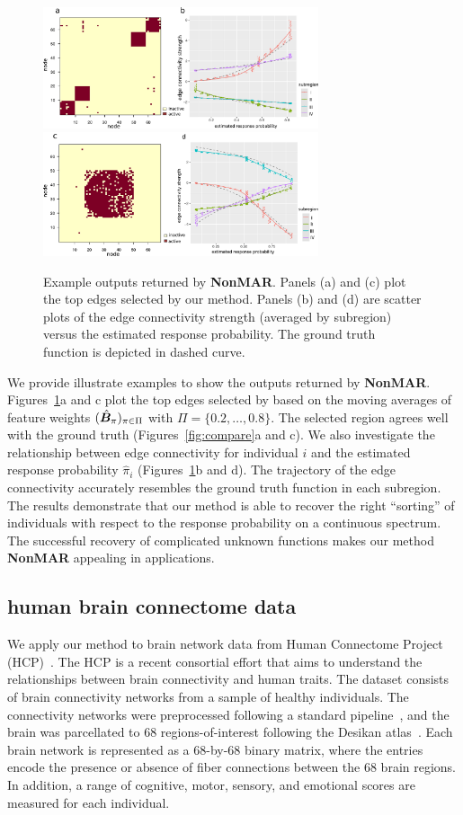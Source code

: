 \documentclass[11pt]{article}
\theoremstyle{plain}
\theoremstyle{definition}
\def\NonparaM{\text{\bf \small NonMAR }}
\begin{document}
\begin{figure}[ht]
    \centering
   \includegraphics[width=8.1cm]{est_block.pdf}
          \includegraphics[width=8.1cm]{est_circle.pdf}
 \caption{Example outputs returned by {\bf \small NonMAR}. Panels (a) and (c) plot the top edges selected by our method. Panels (b) and (d) are scatter plots of the edge connectivity strength (averaged by subregion) versus the estimated response probability. The ground truth function is depicted in dashed curve.}\label{fig:compare2}
\end{figure}


We provide illustrate examples to show the outputs returned by {\bf \small NonMAR}. Figures~\ref{fig:compare2}a and c plot the top edges selected by \NonparaM based on the moving averages of feature weights $(\hat {\bm B}_\pi)_{\pi\in\Pi}$ with $\Pi = \{0.2,\ldots,0.8\}$. The selected region agrees well with the ground truth (Figures~\ref{fig:compare}a and c). We also investigate the relationship between edge connectivity for individual $i$ and the estimated response probability $\hat \pi_i$ (Figures~\ref{fig:compare2}b and d). The trajectory of the edge connectivity accurately resembles the ground truth function in each subregion. The results demonstrate that our method is able to recover the right ``sorting'' of individuals with respect to the response probability on a continuous spectrum. 
The successful recovery of complicated unknown functions makes our method {\bf \small NonMAR} appealing in applications. 

\subsection{human brain connectome data}\label{sec:real}
We apply our method to brain network data from Human Connectome Project (HCP)~\citep{van2013wu}. The HCP is a recent consortial effort that aims to understand the relationships between brain connectivity and human traits. The dataset consists of brain connectivity networks from a sample of healthy individuals. The connectivity networks were preprocessed following a standard pipeline~\citep{zhang2018mapping}, and the brain was parcellated to 68 regions-of-interest following the Desikan atlas~\citep{desikan2006automated}. Each brain network is represented as a 68-by-68 binary matrix, where the entries encode the presence or absence of fiber connections between the 68 brain regions. In addition, a range of cognitive, motor, sensory, and emotional scores are measured for each individual. 
\end{document}
